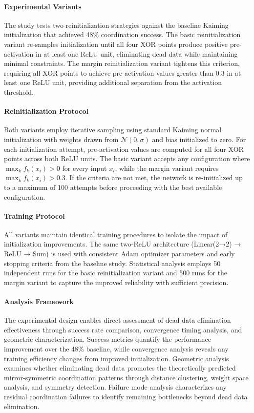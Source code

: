 \paragraph{Experimental Variants}
The study tests two reinitialization strategies against the baseline Kaiming initialization that achieved 48\% coordination success. The basic reinitialization variant re-samples initialization until all four XOR points produce positive pre-activation in at least one ReLU unit, eliminating dead data while maintaining minimal constraints. The margin reinitialization variant tightens this criterion, requiring all XOR points to achieve pre-activation values greater than 0.3 in at least one ReLU unit, providing additional separation from the activation threshold.

\paragraph{Reinitialization Protocol}
Both variants employ iterative sampling using standard Kaiming normal initialization with weights drawn from $\mathcal{N}(0, \sigma)$ and bias initialized to zero. For each initialization attempt, pre-activation values are computed for all four XOR points across both ReLU units. The basic variant accepts any configuration where $\max_k f_k(x_i) > 0$ for every input $x_i$, while the margin variant requires $\max_k f_k(x_i) > 0.3$. If the criteria are not met, the network is re-initialized up to a maximum of 100 attempts before proceeding with the best available configuration.

\paragraph{Training Protocol}
All variants maintain identical training procedures to isolate the impact of initialization improvements. The same two-ReLU architecture (Linear(2→2) → ReLU → Sum) is used with consistent Adam optimizer parameters and early stopping criteria from the baseline study. Statistical analysis employs 50 independent runs for the basic reinitialization variant and 500 runs for the margin variant to capture the improved reliability with sufficient precision.

\paragraph{Analysis Framework}
The experimental design enables direct assessment of dead data elimination effectiveness through success rate comparison, convergence timing analysis, and geometric characterization. Success metrics quantify the performance improvement over the 48\% baseline, while convergence analysis reveals any training efficiency changes from improved initialization. Geometric analysis examines whether eliminating dead data promotes the theoretically predicted mirror-symmetric coordination patterns through distance clustering, weight space analysis, and symmetry detection. Failure mode analysis characterizes any residual coordination failures to identify remaining bottlenecks beyond dead data elimination.

